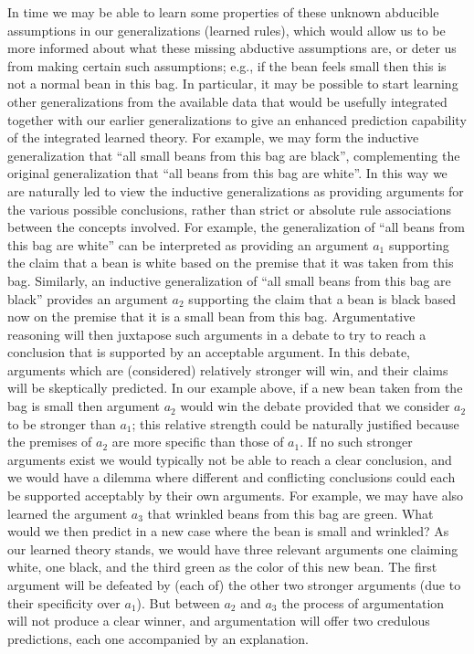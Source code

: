 In time we may be able to learn some properties of these unknown abducible assumptions in our generalizations (learned rules), which would allow us to be more informed about what these missing abductive assumptions are, or deter us from making certain such assumptions; e.g., if the bean feels small then this is not a normal bean in this bag. In particular, it may be possible to start learning other generalizations from the available data that would be usefully integrated together with our earlier generalizations to give an enhanced prediction capability of the integrated learned theory. For example, we may form the inductive generalization that ``all small beans from this bag are black'', complementing the original generalization that ``all beans from this bag are white''.
In this way we are naturally led to view the inductive generalizations as providing arguments for the various possible conclusions, rather than strict or absolute rule associations between the concepts involved. For example, the generalization of ``all beans from this bag are white'' can be interpreted as providing an argument $a_1$ supporting the claim that a bean is white based on the premise that it was taken from this bag. Similarly, an inductive generalization of ``all small beans from this bag are black'' provides an argument $a_2$ supporting the claim that a bean is black based now on the premise that it is a small bean from this bag.
Argumentative reasoning will then juxtapose such arguments in a debate to try to reach a conclusion that is supported by an acceptable argument. In this debate, arguments which are (considered) relatively stronger will win, and their claims will be skeptically predicted. In our example above, if a new bean taken from the bag is small then argument $a_2$ would win the debate provided that we consider $a_2$ to be stronger than $a_1$; this relative strength could be naturally justified because the premises of $a_2$ are more specific than those of $a_1$.
If no such stronger arguments exist we would typically not be able to reach a clear conclusion, and we would have a dilemma where different and conflicting conclusions could each be supported acceptably by their own arguments. For example, we may have also learned the argument $a_3$ that wrinkled beans from this bag are green. What would we then predict in a new case where the bean is small and wrinkled? As our learned theory stands, we would have three relevant arguments one claiming white, one black, and the third green as the color of this new bean. The first argument will be defeated by (each of) the other two stronger arguments (due to their specificity over $a_1$). But between $a_2$ and $a_3$ the process of argumentation will not produce a clear winner, and argumentation will offer two credulous predictions, each one accompanied by an explanation.
